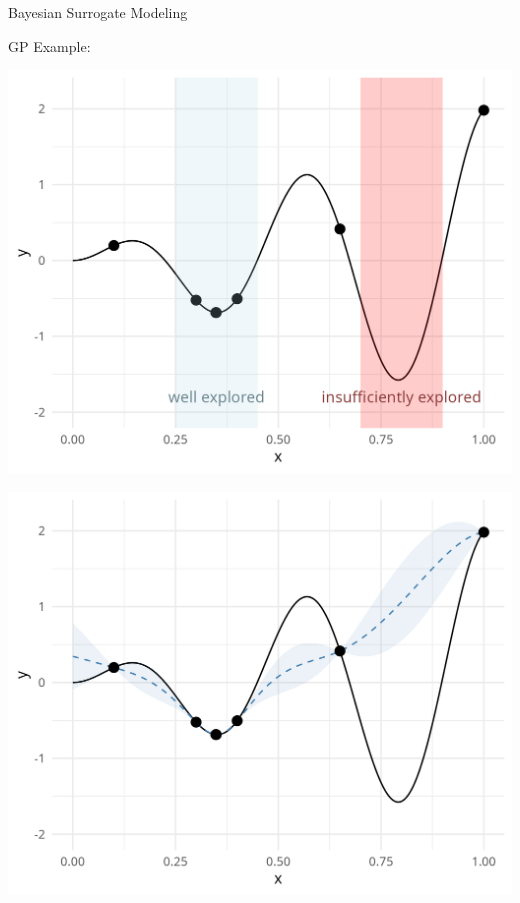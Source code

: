 \documentclass[11pt,compress,t,notes=noshow, xcolor=table]{beamer}
\begin{document}
\begin{vbframe}{Bayesian Surrogate Modeling}
\framebreak

GP Example:
\vspace{+.45cm}

\begin{minipage}[b]{0.45\textwidth}
  \includegraphics[width = \textwidth]{figure_man/bayesian_loop_0.png}
\end{minipage}
\hfill
\begin{minipage}[b]{0.45\textwidth}
  \includegraphics[width = \textwidth]{figure_man/bayesian_loop_1.png}
\end{minipage}

\end{vbframe} 
\end{document}
